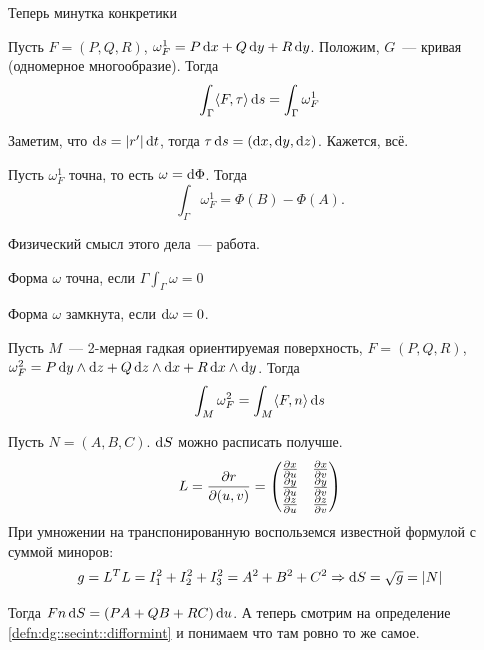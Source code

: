 \documentclass[draft,timbord]{longnotes}
\begin{document}
Теперь минутка конкретики

\begin{prop}\label{prop:dg::secint::diffrmline}
  Пусть $F=(P,Q,R)$, $\omega_F^1 = P\, \mathrm{d} x + Q \, \mathrm{d} y + R\, \mathrm{d} y$.
  Положим, $G$~--- кривая (одномерное многообразие).
  Тогда
  \[
    \int_ \Gamma \langle F,\tau \rangle\, \mathrm{d} s = \int_\Gamma \omega_F^1
  \]
\end{prop}
\begin{lproof}
  Заметим, что $\mathrm{d} s = |r'|\, \mathrm{d} t$, тогда $\tau \,\mathrm{d} s = (\mathrm{d} x, \mathrm{d} y, \mathrm{d} z)$.
  Кажется, всё.
\end{lproof}

\begin{prop}\label{prop:dg::secint::prec}
  Пусть $\omega_F^1$ точна, то есть $\omega = \mathrm{d} \Phi$. Тогда \[
    \int_\Gamma \omega_F^1 = \Phi(B) - \Phi (A).
  \]
\end{prop}

Физический смысл этого дела~--- работа.

\begin{defn}\label{defn:dg::secint::prec}
  Форма $\omega$ точна, если $\Gamma \int_\Gamma \omega = 0$
\end{defn}
\begin{defn}\label{defn:dg::secint::clos}
  Форма $\omega$ замкнута, если $\mathrm{d} \omega = 0$.
\end{defn}

\def\wdgcoef#1#2#3{#1\, \del #2 \wedge \del #3}
\begin{prop}\label{prop:dg::secint::surfdiffform}
  Пусть $M$~--- 2-мерная гадкая ориентируемая поверхность, $F=(P,Q,R)$,
  $\omega_F^2 = \wdgcoef{P}{y}{z} + \wdgcoef{Q}{z}{x} + \wdgcoef{R}{x}{y} $. Тогда \[
    \int_M \omega_F^2 = \int_M  \langle F,n  \rangle\, \mathrm{d} s
  \]
\end{prop}
\begin{lproof}
  \def\arraystretch{1.5}
  Пусть $N = (A,B,C)$. $\mathrm{d} S$ можно расписать получше.
  \[
    L = \frac{\partial r}{\partial (u,v)} = 
    \begin{pmatrix}
      \frac{\partial x}{\partial u} & \frac{\partial x}{\partial v} \\
      \frac{\partial y}{\partial u} & \frac{\partial y}{\partial v} \\
      \frac{\partial z}{\partial u} & \frac{\partial z}{\partial v} 
    \end{pmatrix}
  \]
  При умножении на транспонированную воспольземся известной формулой с суммой миноров:
  \[
    g = L^T L = I_1^2 + I_2^2 + I_3^2 = A^2 + B^2 + C^2 \Rightarrow \mathrm{d} S = \sqrt{g} = |N|
  \]

  Тогда $F n\, \mathrm{d} S = (PA+QB+RC) \, \mathrm{d} u$. А теперь смотрим на определение \ref{defn:dg::secint::difformint} 
  и понимаем что там ровно то же самое.
\end{lproof}
\end{document}
